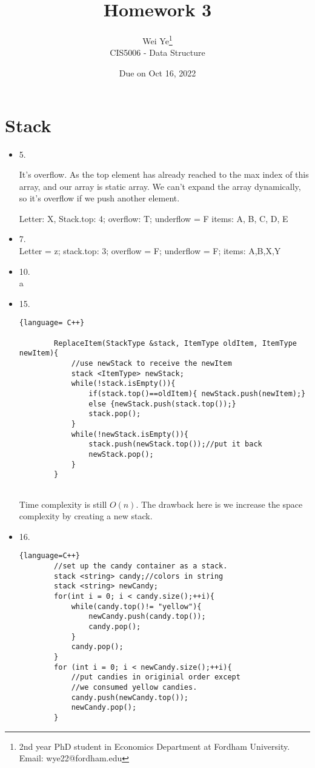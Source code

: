 \documentclass[11pt]{article} %
\title{Homework 3}
\author{Wei Ye\footnote{2nd year PhD student in Economics Department at Fordham University. Email: wye22@fordham.edu}
    \\ CIS5006 - Data Structure}
\date{Due on Oct 16, 2022}
\begin{document}
\maketitle

\section{Stack}
\begin{itemize}
    \item 5.
    
    It's overflow. As the top element has already reached to the max index of this array, and our array is static array. We can't expand the array dynamically, so it's overflow if we push another element.

    Letter: X, Stack.top: 4; overflow: T; underflow = F   items: A, B, C, D, E

    \item 7.\\
    Letter = z; stack.top: 3; overflow = F; underflow = F; items: A,B,X,Y
    
    \item 10.\\
    a
    \item 15. \\ 
    \begin{lstlisting}{language= C++}
        
        ReplaceItem(StackType &stack, ItemType oldItem, ItemType newItem){
            //use newStack to receive the newItem
            stack <ItemType> newStack;
            while(!stack.isEmpty()){
                if(stack.top()==oldItem){ newStack.push(newItem);}
                else {newStack.push(stack.top());}
                stack.pop();
            }
            while(!newStack.isEmpty()){
                stack.push(newStack.top());//put it back
                newStack.pop();
            }
        }
        
    \end{lstlisting}
    Time complexity is still $O(n)$. The drawback here is we increase the space complexity by creating a new stack. 

    \item 16.\\
    \begin{lstlisting}{language=C++}
        //set up the candy container as a stack.
        stack <string> candy;//colors in string
        stack <string> newCandy;
        for(int i = 0; i < candy.size();++i){
            while(candy.top()!= "yellow"){
                newCandy.push(candy.top());
                candy.pop();
            }
            candy.pop();
        }
        for (int i = 0; i < newCandy.size();++i){
            //put candies in originial order except
            //we consumed yellow candies.
            candy.push(newCandy.top());
            newCandy.pop();
        }
    \end{lstlisting}


\end{itemize}
\end{document}
